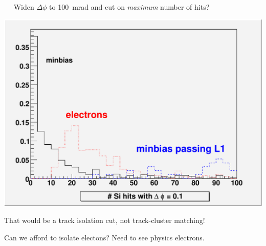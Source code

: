 \documentclass[landscape]{article}
\newenvironment{slide}[1][ ]{\mbox{\bf #1 } \vfill}{\vfill \mbox{ } \hfill \Large \arabic{page} \pagebreak}
\begin{document}
\begin{slide}
Widen $\Delta \phi$ to 100~mrad and cut on {\it maximum} number of hits?

\begin{center}
\includegraphics[width=0.65\linewidth]{hitdistributions_wide}
\end{center}

That would be a track isolation cut, not track-cluster matching!

Can we afford to isolate electons?  Need to see physics electrons.

\vspace{0.25 cm}
\begin{center}
\textcolor{blue}{}
\end{center}
\end{slide}
\end{document}
